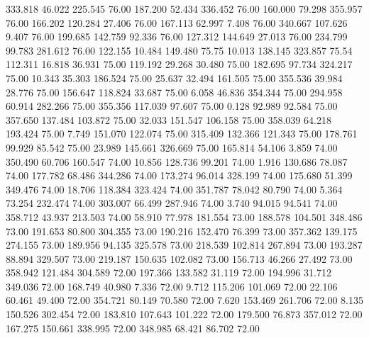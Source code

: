  333.818   46.022  225.545        76.00
 187.200   52.434  336.452        76.00
 160.000   79.298  355.957        76.00
 166.202  120.284   27.406        76.00
 167.113   62.997    7.408        76.00
 340.667  107.626    9.407        76.00
 199.685  142.759   92.336        76.00
 127.312  144.649   27.013        76.00
 234.799   99.783  281.612        76.00
 122.155   10.484  149.480        75.75
  10.013  138.145  323.857        75.54
 112.311   16.818   36.931        75.00
 119.192   29.268   30.480        75.00
 182.695   97.734  324.217        75.00
  10.343   35.303  186.524        75.00
  25.637   32.494  161.505        75.00
 355.536   39.984   28.776        75.00
 156.647  118.824   33.687        75.00
   6.058   46.836  354.344        75.00
 294.958   60.914  282.266        75.00
 355.356  117.039   97.607        75.00
   0.128   92.989   92.584        75.00
 357.650  137.484  103.872        75.00
  32.033  151.547  106.158        75.00
 358.039   64.218  193.424        75.00
   7.749  151.070  122.074        75.00
 315.409  132.366  121.343        75.00
 178.761   99.929   85.542        75.00
  23.989  145.661  326.669        75.00
 165.814   54.106    3.859        74.00
 350.490   60.706  160.547        74.00
  10.856  128.736   99.201        74.00
   1.916  130.686   78.087        74.00
 177.782   68.486  344.286        74.00
 173.274   96.014  328.199        74.00
 175.680   51.399  349.476        74.00
  18.706  118.384  323.424        74.00
 351.787   78.042   80.790        74.00
   5.364   73.254  232.474        74.00
 303.007   66.499  287.946        74.00
   3.740   94.015   94.541        74.00
 358.712   43.937  213.503        74.00
  58.910   77.978  181.554        73.00
 188.578  104.501  348.486        73.00
 191.653   80.800  304.355        73.00
 190.216  152.470   76.399        73.00
 357.362  139.175  274.155        73.00
 189.956   94.135  325.578        73.00
 218.539  102.814  267.894        73.00
 193.287   88.894  329.507        73.00
 219.187  150.635  102.082        73.00
 156.713   46.266   27.492        73.00
 358.942  121.484  304.589        72.00
 197.366  133.582   31.119        72.00
 194.996   31.712  349.036        72.00
 168.749   40.980    7.336        72.00
   9.712  115.206  101.069        72.00
  22.106   60.461   49.400        72.00
 354.721   80.149   70.580        72.00
   7.620  153.469  261.706        72.00
   8.135  150.526  302.454        72.00
 183.810  107.643  101.222        72.00
 179.500   76.873  357.012        72.00
 167.275  150.661  338.995        72.00
 348.985   68.421   86.702        72.00
